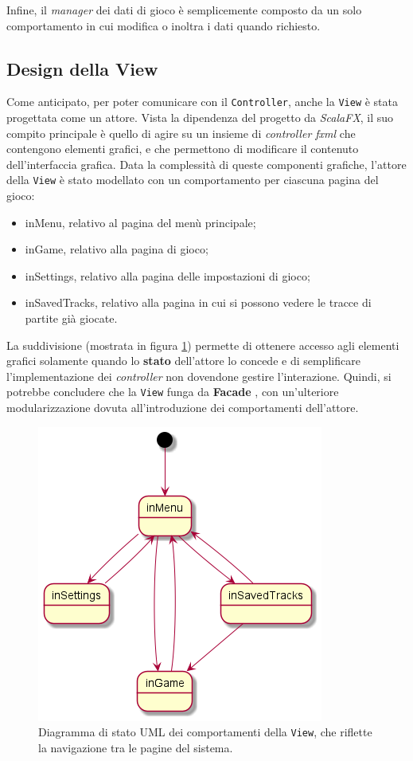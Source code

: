 Infine, il \textit{manager} dei dati di gioco è semplicemente composto da un solo comportamento in cui modifica o
inoltra i dati quando richiesto.

\subsection{Design della View}
Come anticipato, per poter comunicare con il \texttt{Controller}, anche la \texttt{View} è stata progettata come un
attore. Vista la dipendenza del progetto da \textit{ScalaFX}, il suo compito principale è quello di agire su un insieme
di \textit{controller fxml} che contengono elementi grafici, e che permettono di modificare il contenuto
dell'interfaccia grafica. Data la complessità di queste componenti grafiche, l'attore della \texttt{View} è stato
modellato con un comportamento per ciascuna pagina del gioco:
\begin{itemize}
    \item inMenu, relativo al pagina del menù principale;
    \item inGame, relativo alla pagina di gioco;
    \item inSettings, relativo alla pagina delle impostazioni di gioco;
    \item inSavedTracks, relativo alla pagina in cui si possono vedere le tracce di partite già giocate.
\end{itemize}

La suddivisione (mostrata in figura \ref{fig:view-behaviors}) permette di ottenere accesso agli elementi grafici
solamente quando lo \textbf{stato} dell'attore lo concede e di semplificare l'implementazione dei \textit{controller}
non dovendone gestire l'interazione. Quindi, si potrebbe concludere che la \texttt{View} funga da \textbf{Facade}
\cite{FacadePattern}, con un'ulteriore modularizzazione dovuta all'introduzione dei comportamenti dell'attore.

\begin{figure}[H]
    \centering
    \includegraphics[width=.5\linewidth]{img/state-view-behaviors}
    \caption{Diagramma di stato UML dei comportamenti della \texttt{View}, che riflette la navigazione tra le pagine
    del sistema.}
    \label{fig:view-behaviors}
\end{figure}

